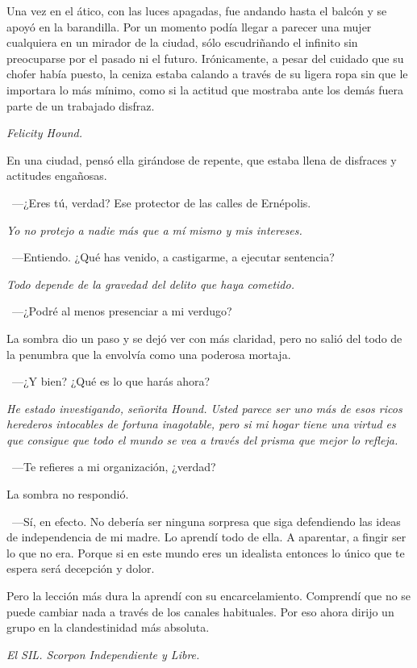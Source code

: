 Una vez en el ático, con las luces apagadas, fue andando hasta el balcón y se apoyó en la barandilla. Por un momento podía llegar a parecer una mujer cualquiera en un mirador de la ciudad, sólo escudriñando el infinito sin preocuparse por el pasado ni el futuro. Irónicamente, a pesar del cuidado que su chofer había puesto, la ceniza estaba calando a través de su ligera ropa sin que le importara lo más mínimo, como si la actitud que mostraba ante los demás fuera parte de un trabajado disfraz.

\emph{Felicity Hound.}

En una ciudad, pensó ella girándose de repente, que estaba llena de disfraces y actitudes engañosas.

~---¿Eres tú, verdad? Ese protector de las calles de Ernépolis.

\emph{Yo no protejo a nadie más que a mí mismo y mis intereses.}

~---Entiendo. ¿Qué has venido, a castigarme, a ejecutar sentencia?

\emph{Todo depende de la gravedad del delito que haya cometido.}

~---¿Podré al menos presenciar a mi verdugo?

La sombra dio un paso y se dejó ver con más claridad, pero no salió del todo de la penumbra que la envolvía como una poderosa mortaja.

~---¿Y bien? ¿Qué es lo que harás ahora?

\emph{He estado investigando, señorita Hound. Usted parece ser uno más de esos ricos herederos intocables de fortuna inagotable, pero si mi hogar tiene una virtud es que consigue que todo el mundo se vea a través del prisma que mejor lo refleja.}

~---Te refieres a mi organización, ¿verdad?

La sombra no respondió.

~---Sí, en efecto. No debería ser ninguna sorpresa que siga defendiendo las ideas de independencia de mi madre. Lo aprendí todo de ella. A aparentar, a fingir ser lo que no era. Porque si en este mundo eres un idealista entonces lo único que te espera será decepción y dolor.

\rquoti{}Pero la lección más dura la aprendí con su encarcelamiento. Comprendí que no se puede cambiar nada a través de los canales habituales. Por eso ahora dirijo un grupo en la clandestinidad más absoluta.

\emph{El SIL. Scorpon Independiente y Libre.}

